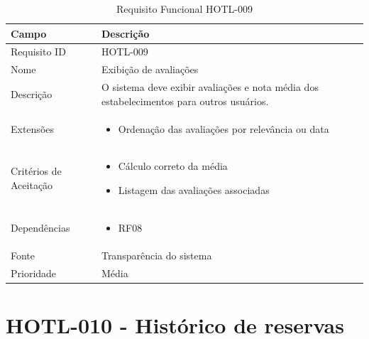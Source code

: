 \documentclass[
    12pt,
    oneside,
    a4paper,
    brazil
]{abntex2}
\begin{document}
\begin{table}[h]
	\begin{tabular}{|l|p{10cm}|}
		\hline
		\textbf{Campo} & \textbf{Descrição} \\
		\hline
		Requisito ID & HOTL-009 \\
		\hline
		Nome & Exibição de avaliações\\
		\hline
		Descrição & O sistema deve exibir avaliações e nota média dos estabelecimentos para outros usuários. \\
		\hline
		Extensões & \begin{itemize}[leftmargin=*, labelsep=0.5em, noitemsep, topsep=0pt]
		\item Ordenação das avaliações por relevância ou data
		\end{itemize} \\
		\hline
		Critérios de Aceitação & \begin{itemize}[leftmargin=*, labelsep=0.5em, noitemsep, topsep=0pt]
		\item Cálculo correto da média
		\item Listagem das avaliações associadas
		\end{itemize} \\
		\hline
		Dependências & \begin{itemize}[leftmargin=*, labelsep=0.5em, noitemsep, topsep=0pt] 
		\item RF08
		\end{itemize} \\
		\hline
		Fonte & Transparência do sistema \\
		\hline
		Prioridade & Média \\
		\hline
	\end{tabular}
	\caption{Requisito Funcional HOTL-009}
\end{table}

\section{HOTL-010 - Histórico de reservas}
\end{document}
